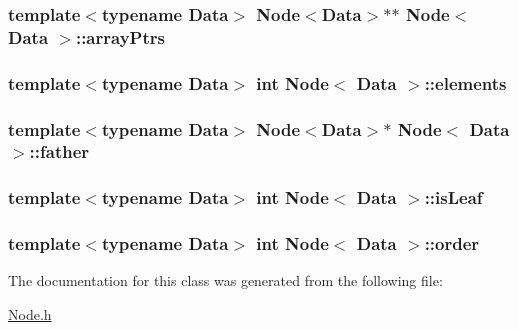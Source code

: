 \subsubsection[{\texorpdfstring{array\+Ptrs}{arrayPtrs}}]{\setlength{\rightskip}{0pt plus 5cm}template$<$typename Data$>$ {\bf Node}$<${\bf Data}$>$$\ast$$\ast$ {\bf Node}$<$ {\bf Data} $>$\+::array\+Ptrs}\hypertarget{classNode_a9dfc15b1a1835593b1061ba5d6685a20}{}\label{classNode_a9dfc15b1a1835593b1061ba5d6685a20}
\subsubsection[{\texorpdfstring{elements}{elements}}]{\setlength{\rightskip}{0pt plus 5cm}template$<$typename Data$>$ int {\bf Node}$<$ {\bf Data} $>$\+::elements}\hypertarget{classNode_a78a7edbe6baf7950b4b937baf3a8977c}{}\label{classNode_a78a7edbe6baf7950b4b937baf3a8977c}
\subsubsection[{\texorpdfstring{father}{father}}]{\setlength{\rightskip}{0pt plus 5cm}template$<$typename Data$>$ {\bf Node}$<${\bf Data}$>$$\ast$ {\bf Node}$<$ {\bf Data} $>$\+::father}\hypertarget{classNode_ab8b577c94add9ebf4392c82301bcc49e}{}\label{classNode_ab8b577c94add9ebf4392c82301bcc49e}
\subsubsection[{\texorpdfstring{is\+Leaf}{isLeaf}}]{\setlength{\rightskip}{0pt plus 5cm}template$<$typename Data$>$ int {\bf Node}$<$ {\bf Data} $>$\+::is\+Leaf}\hypertarget{classNode_add792264f859e503c01ad702e579c5b2}{}\label{classNode_add792264f859e503c01ad702e579c5b2}
\subsubsection[{\texorpdfstring{order}{order}}]{\setlength{\rightskip}{0pt plus 5cm}template$<$typename Data$>$ int {\bf Node}$<$ {\bf Data} $>$\+::order}\hypertarget{classNode_a672764de1b85ccfcb1c55429b5efbb1a}{}\label{classNode_a672764de1b85ccfcb1c55429b5efbb1a}


The documentation for this class was generated from the following file\+:\begin{DoxyCompactItemize}
\item 
\hyperlink{Node_8h}{Node.\+h}\end{DoxyCompactItemize}
